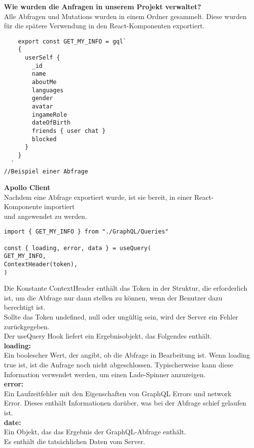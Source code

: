 \textbf{Wie wurden die Anfragen in unserem Projekt verwaltet?}\\
Alle Abfragen und Mutations wurden in einem Ordner gesammelt.
Diese wurden für die spätere Verwendung in den React-Komponenten exportiert.

\begin{lstlisting}
    export const GET_MY_INFO = gql`
    {
      userSelf {
        _id
        name
        aboutMe
        languages
        gender
        avatar
        ingameRole
        dateOfBirth
        friends { user chat }        
        blocked
      }
    }
  `
//Beispiel einer Abfrage
\end{lstlisting}


\newpage
\textbf{Apollo Client}\\
Nachdem eine Abfrage exportiert wurde, ist sie bereit, in einer React-Komponente importiert \\ und angewendet zu werden.

\begin{lstlisting}
import { GET_MY_INFO } from "./GraphQL/Queries"

const { loading, error, data } = useQuery(
GET_MY_INFO,
ContextHeader(token),
)
\end{lstlisting}
Die Konstante ContextHeader enthält das Token in der Struktur, die erforderlich ist, um die Abfrage nur dann stellen zu können, wenn der Benutzer dazu berechtigt ist.
\\
Sollte das Token undefined, null oder ungültig sein, wird der Server ein Fehler zurückgegeben.
\\ 

Der useQuery Hook liefert ein Ergebnisobjekt, das Folgendes enthält.
\\
\textbf{loading:}\\
Ein boolescher Wert, der angibt, ob die Abfrage in Bearbeitung ist.
Wenn loading true ist, ist die Anfrage noch nicht abgeschlossen. Typischerweise kann diese Information verwendet werden, um einen Lade-Spinner anzuzeigen.
\\

\textbf{error:}\\
Ein Laufzeitfehler mit den Eigenschaften von GraphQL Errors und network Error.
Dieses enthält Informationen darüber, was bei der Abfrage schief gelaufen ist.
\\

\textbf{date:}\\
Ein Objekt, das das Ergebnis der GraphQL-Abfrage enthält.
\\Es enthält die tatsächlichen Daten vom Server.
\\

